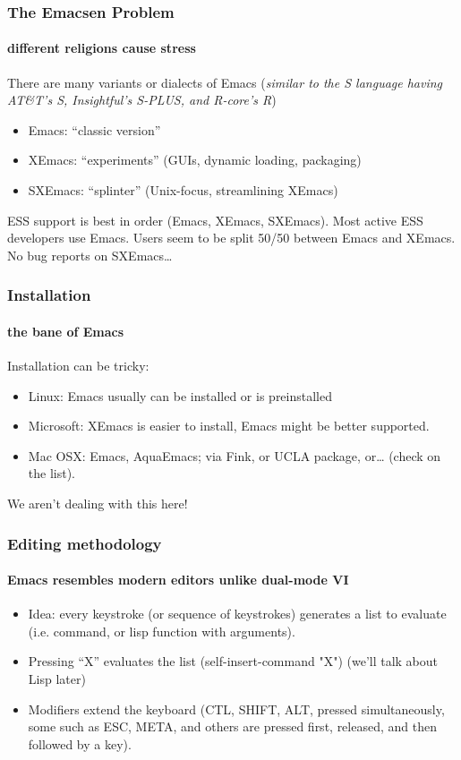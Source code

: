 \documentclass{beamer}
\begin{document}
\begin{frame}
  \frametitle{The Emacsen Problem}
  \framesubtitle{different religions cause stress}
  There are many variants or dialects of Emacs (\textit{similar to the
    S language having AT\&T's S, Insightful's S-PLUS, and R-core's R})
  \begin{itemize}
  \item Emacs: ``classic version''
  \item XEmacs: ``experiments'' (GUIs, dynamic loading, packaging)
  \item SXEmacs: ``splinter'' (Unix-focus, streamlining XEmacs)
  \end{itemize}
  
  ESS support is best in order (Emacs, XEmacs, SXEmacs).  Most active
  ESS developers use Emacs.  Users seem to be split 50/50 between
  Emacs and XEmacs.\\
  No bug reports on SXEmacs\ldots 
\end{frame}

\begin{frame}
  \frametitle{Installation}
  \framesubtitle{the bane of Emacs}
  Installation can be tricky:
  \begin{itemize}
  \item Linux: Emacs usually can be installed or is preinstalled
  \item Microsoft: XEmacs is easier to install, Emacs might be better
    supported.
  \item Mac OSX: Emacs, AquaEmacs; via Fink, or UCLA package, or\ldots
    (check on the list).
  \end{itemize}
  We aren't dealing with this here!
\end{frame}

\begin{frame} \frametitle{Editing methodology}
  \framesubtitle{Emacs resembles modern editors unlike dual-mode VI}

  \begin{itemize}
  \item Idea: every keystroke (or sequence of keystrokes) generates a
    list to evaluate (i.e. command, or lisp function with arguments).
  \item Pressing ``X'' evaluates the list (self-insert-command "X")  (we'll talk about Lisp later)    
  \item Modifiers extend the keyboard (CTL, SHIFT, ALT, pressed
    simultaneously, some such as ESC, META, and others are pressed
    first, released, and then followed by a key).
  \end{itemize}
\end{frame}
\end{document}
